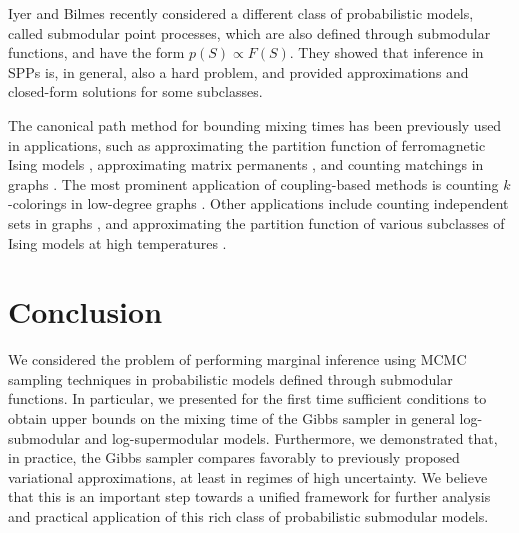 Iyer and Bilmes \cite{iyer15} recently considered a different class of probabilistic models, called submodular point processes, which are also defined through submodular functions, and have the form $p(S) \propto F(S)$.
They showed that inference in SPPs is, in general, also a hard problem, and provided approximations and closed-form solutions for some subclasses.

The canonical path method for bounding mixing times has been previously used in applications, such as approximating the partition function of ferromagnetic Ising models \cite{jerrum93}, approximating matrix permanents \cite{jerrum89,jerrum04perm}, and counting matchings in graphs \cite{jerrum03}.
The most prominent application of coupling-based methods is counting $k$-colorings in low-degree graphs \cite{jerrum95,bubley98,jerrum03}.
Other applications include counting independent sets in graphs \cite{dyer00}, and approximating the partition function of various subclasses of Ising models at high temperatures \cite{levin08}.

\section{Conclusion}
We considered the problem of performing marginal inference using MCMC sampling techniques in probabilistic models defined through submodular functions.
In particular, we presented for the first time sufficient conditions to obtain upper bounds on the mixing time of the Gibbs sampler in general log-submodular and log-supermodular models.
Furthermore, we demonstrated that, in practice, the Gibbs sampler compares favorably to previously proposed variational approximations, at least in regimes of high uncertainty.
We believe that this is an important step towards a unified framework for further analysis and practical application of this rich class of probabilistic submodular models.